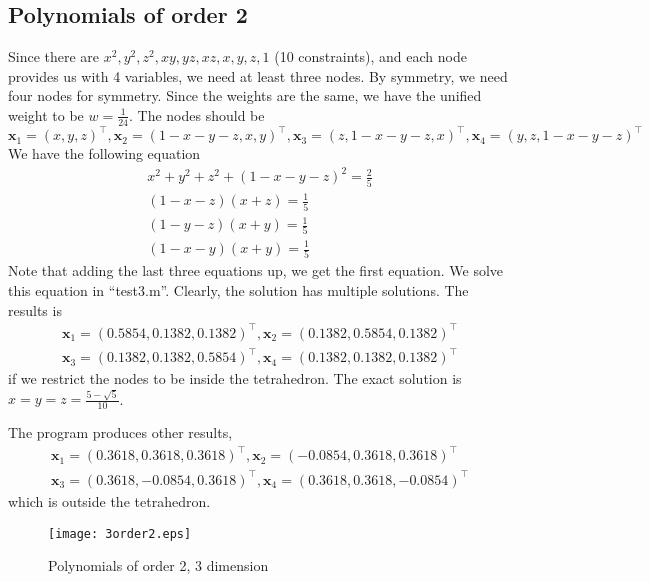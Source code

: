 \documentclass[conference,onecolumn, 12pt]{IEEEtran}
\begin{document}
\subsection{Polynomials of order 2}
Since there are $x^2,y^2,z^2,xy,yz,xz,x,y,z,1$ (10 constraints), and each node provides us with 4 variables, we need at least three nodes. By symmetry, we need four nodes for symmetry. Since the weights are the same, we have the unified weight to be $w=\frac{1}{24}$. The nodes should be
\begin{equation}
    \mathbf{x}_1=(x,y,z)^\top,\mathbf{x}_2=(1-x-y-z,x,y)^\top, \mathbf{x}_3=(z,1-x-y-z,x)^\top,\mathbf{x}_4=(y,z,1-x-y-z)^\top
\end{equation}
We have the following equation
\begin{subequations}
    \begin{align}
        x^2+y^2+z^2+(1-x-y-z)^2=\frac{2}{5}\\
        (1-x-z)(x+z)=\frac{1}{5}\\ 
        (1-y-z)(x+y)=\frac{1}{5}\\
        (1-x-y)(x+y)=\frac{1}{5}
    \end{align}
\end{subequations}
Note that adding the last three equations up, we get the first equation. We solve this equation in ``test3.m''. Clearly, the solution has multiple solutions. The results is
\begin{equation}
    \begin{split}
        \mathbf{x}_1=(0.5854,0.1382,0.1382)^\top,\mathbf{x}_2=(0.1382,0.5854,0.1382)^\top\\
        \mathbf{x}_3=(0.1382,0.1382,0.5854)^\top,\mathbf{x}_4=(0.1382,0.1382,0.1382)^\top
    \end{split}
\end{equation}
if we restrict the nodes to be inside the tetrahedron. The exact solution is
$x=y=z=\frac{5-\sqrt{5}}{10}$.

The program produces other results, 
\begin{equation}
    \begin{split}
        \mathbf{x}_1=(0.3618,0.3618,0.3618)^\top,\mathbf{x}_2=(-0.0854,0.3618,0.3618)^\top\\
        \mathbf{x}_3=(0.3618,-0.0854,0.3618)^\top,\mathbf{x}_4=(0.3618,0.3618,-0.0854)^\top
    \end{split}
\end{equation}
which is outside the tetrahedron.
\begin{figure}[!htbp]
    \centering
    \texttt{[image: 3order2.eps]}
    \caption{Polynomials of order 2, 3 dimension}
    \label{3p2}
\end{figure}
\end{document}
